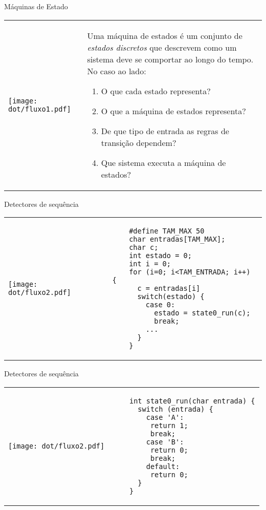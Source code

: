 \documentclass{beamer}
\begin{document}
\begin{frame}{Máquinas de Estado}
  \centering
  \large
  \begin{tabular}{l m{6cm}}
    \begin{minipage}{.3\textwidth}
  \texttt{[image: dot/fluxo1.pdf]}
    \end{minipage}
  &
    Uma máquina de estados é um conjunto de \textit{estados discretos} que
    descrevem como um sistema deve se comportar ao longo do tempo. No caso ao
    lado:
    \begin{enumerate}
      \item O que cada estado representa?
      \item O que a máquina de estados representa?
      \item De que tipo de entrada as regras de transição dependem?
      \item Que sistema executa a máquina de estados?
    \end{enumerate}
    \\
  \end{tabular}
\end{frame}

\begin{frame}[fragile]{Detectores de sequência}
  \centering
  \large
  \begin{tabular}{l m{8cm}}
    \begin{minipage}{.3\textwidth}
   \texttt{[image: dot/fluxo2.pdf]}
    \end{minipage}
  &
    \begin{verbatim}
    #define TAM_MAX 50
    char entradas[TAM_MAX];
    char c;
    int estado = 0;
    int i = 0;
    for (i=0; i<TAM_ENTRADA; i++) {
      c = entradas[i]
      switch(estado) {
        case 0:
          estado = state0_run(c);
          break;
        ...
      }
    }

    \end{verbatim}
    \\
  \end{tabular}
\end{frame}


\begin{frame}[fragile]{Detectores de sequência}
  \centering
  \large
  \begin{tabular}{l m{8cm}}
    \begin{minipage}{.3\textwidth}
   \texttt{[image: dot/fluxo2.pdf]}
    \end{minipage}
  &
    \begin{verbatim}
    int state0_run(char entrada) {
      switch (entrada) {
        case 'A':
         return 1;
         break;
        case 'B':
         return 0;
         break;
        default:
         return 0;
      }
    }
    \end{verbatim}
    \\
  \end{tabular}
\end{frame}
\end{document}
